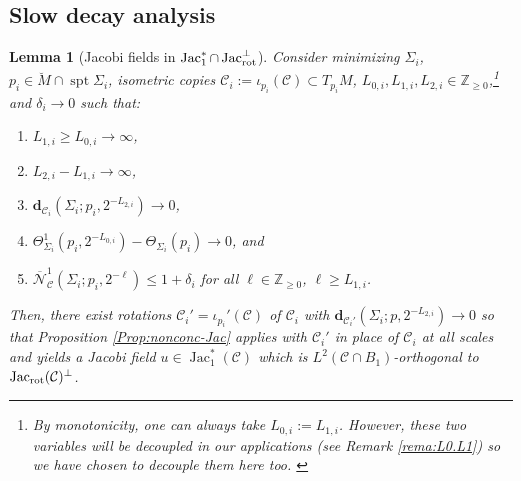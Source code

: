 \documentclass[11pt, letterpaper, reqno]{amsart}
\numberwithin{equation}{section}
\newtheorem{Lem}[Def]{Lemma}
\theoremstyle{remark}
\newcommand{\ZZ}{\mathbb{Z}}
\newcommand{\cC}{\mathcal{C}}
\newcommand{\cN}{\mathcal{N}}
\newcommand{\mbfd}{\mathbf{d}}
\newcommand{\spt}{\operatorname{spt}}
\newcommand{\Jac}{\operatorname{Jac}}
\begin{document}
\subsection{Slow decay analysis} \label{sec:nonlinear.lf}

\begin{Lem}[Jacobi fields in $\Jac^*_1 \cap \Jac_{\textnormal{rot}}^\perp$] \label{Lem:ortho-rot}
Consider minimizing $\Sigma_i$, $p_i \in \breve M \cap \spt \Sigma_i$, isometric copies $\cC_i := \iota_{p_i}(\cC) \subset T_{p_i}M$, $L_{0,i}, L_{1,i}, L_{2,i} \in \ZZ_{\geq 0}$,\footnote{By monotonicity, one can always take $L_{0,i} := L_{1,i}$. However, these two variables will be decoupled in our applications (see Remark \ref{rema:L0.L1}) so we have chosen to decouple them here too. \label{footnote:L0.L1}} and $\delta_i \to 0$ such that:
\begin{enumerate}
\item $L_{1,i} \geq L_{0,i} \to \infty$,
\item $L_{2,i} - L_{1,i} \to\infty$,
\item $\mbfd_{\cC_i}(\Sigma_i;p_i,2^{-L_{2,i}}) \to 0$, 
\item $\Theta^{1}_{\Sigma_i}(p_i,2^{-L_{0,i}}) - \Theta_{\Sigma_i}(p_i) \to 0$, and
\item $\overline{\cN}^{1}_{\cC}(\Sigma_i;p_i,2^{-\ell})\leq 1+\delta_i$ for all $\ell \in \ZZ_{\geq 0}$, $\ell \geq L_{1,i}$.
\end{enumerate}
Then, there exist rotations $\cC_i' = \iota_{p_i}'(\cC)$ of $\cC_i$ with $\mbfd_{\cC_i'}(\Sigma_i;p,2^{-L_{2,i}}) \to 0$ so that Proposition \ref{Prop:nonconc-Jac} applies with $\cC_i'$ in place of $\cC_i$ at all scales and yields a Jacobi field $u \in \Jac^*_1(\cC)$ which is $L^2(\cC \cap B_1)$-orthogonal to $\Jac_{\textnormal{rot}}(\cC)^\perp$.
\end{Lem}
\end{document}
